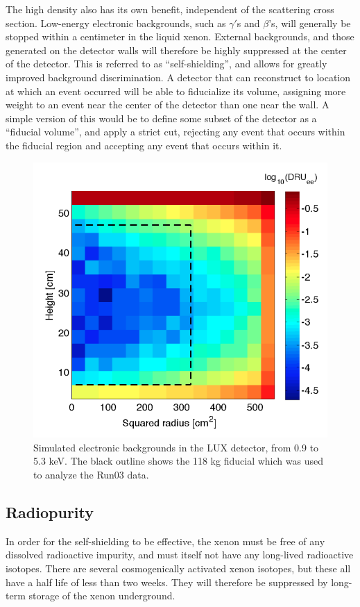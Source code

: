 The high density also has its own benefit, independent of the scattering cross section. Low-energy electronic backgrounds, such as $\gamma'$s and $\beta$'s, will generally be stopped within a centimeter in the liquid xenon. External backgrounds, and those generated on the detector walls will therefore be highly suppressed at the center of the detector. This is referred to as ``self-shielding'', and allows for greatly improved background discrimination. A detector that can reconstruct to location at which an event occurred will be able to fiducialize its volume, assigning more weight to an event near the center of the detector than one near the wall. A simple version of this would be to define some subset of the detector as a ``fiducial volume'', and apply a strict cut, rejecting any event that occurs within the fiducial region and accepting any event that occurs within it.
\begin{figure}[h!]
\centering
\includegraphics[width=\linewidth]{Figures/lux_fiducial.png}
\caption{Simulated electronic backgrounds in the LUX detector, from 0.9 to 5.3 keV. The black outline shows the 118 kg fiducial which was used to analyze the Run03 data.\cite{lux_fiducial}}
\label{fig:lux_fiducial} 
\end{figure}

\clearpage
\subsection{Radiopurity}
In order for the self-shielding to be effective, the xenon must be free of any dissolved radioactive impurity, and must itself not have any long-lived radioactive isotopes. There are several cosmogenically activated xenon isotopes, but these all have a half life of less than two weeks. They will therefore be suppressed by long-term storage of the xenon underground.

